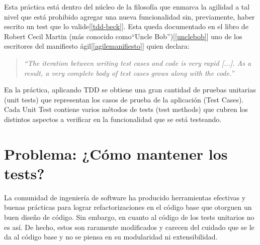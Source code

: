 \par Esta práctica está dentro del núcleo de la filosofía que enmarca la agilidad a tal nivel que está prohibido agregar una nueva funcionalidad sin, previamente, haber escrito un test que lo valide[\ref{tdd-beck}]. Esta queda documentado en el libro de Robert Cecil Martin (más conocido como``Uncle Bob'')[\ref{unclebob}] uno de los escritores del manifiesto ágil[\ref{agilemanifiesto}] quien declara:

\begin{quote}
\emph{``The iteration between writing test cases and code is very rapid [...]. As a result, a very complete body of test cases grows along with the code.''}
\end{quote}


\par En la práctica, aplicando TDD se obtiene una gran cantidad de pruebas unitarias (unit tests) que representan los casos de prueba de la aplicación (Test Cases). Cada Unit Test contiene varios métodos de tests (test methods) que cubren los distintos aspectos a verificar en la funcionalidad que se está testeando.


\section{Problema: ¿Cómo mantener los tests?}

\par La comunidad de ingeniería de software ha producido herramientas efectivas y buenas prácticas para lograr refactorizaciones en el código base que otorguen un buen diseño de código. Sin embargo, en cuanto al código de los tests unitarios no es así. De hecho, estos son raramente modificados y carecen del cuidado que se le da al código base y no se piensa en su modularidad ni extensibilidad. 


